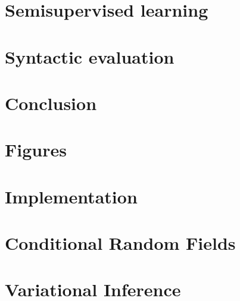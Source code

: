 \documentclass[examplefnt,biber]{../src/nowfnt} %
\begin{document}
\chapter{Semisupervised learning}
\label{05-semisupervised}



\chapter{Syntactic evaluation}
\label{06-syneval}



\chapter{Conclusion}
\label{07-conclusion}



\appendix
\chapter{Figures}
\label{A1-figures}



\chapter{Implementation}
\label{A2-implementation}



\chapter{Conditional Random Fields}
\label{A3-crf}



\chapter{Variational Inference}
\label{A4-vi}



\printbibliography


\backmatter  %
\end{document}
